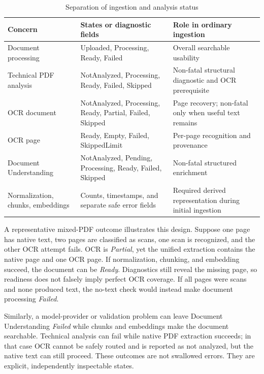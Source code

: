 \begin{table}[!htbp]
	\centering
	\small
	\caption{Separation of ingestion and analysis status}
	\label{tab:processing-statuses}
	\begin{tabular}{p{3.0cm}p{5.2cm}p{4.8cm}}
		\toprule
		Concern & States or diagnostic fields & Role in ordinary ingestion \\
		\midrule
		Document processing & Uploaded, Processing, Ready, Failed & Overall searchable usability \\
		Technical PDF analysis & NotAnalyzed, Processing, Ready, Failed, Skipped & Non-fatal structural diagnostic and OCR prerequisite \\
		OCR document & NotAnalyzed, Processing, Ready, Partial, Failed, Skipped & Page recovery; non-fatal only when useful text remains \\
		OCR page & Ready, Empty, Failed, SkippedLimit & Per-page recognition and provenance \\
		Document Understanding & NotAnalyzed, Pending, Processing, Ready, Failed, Skipped & Non-fatal structured enrichment \\
		Normalization, chunks, embeddings & Counts, timestamps, and separate safe error fields & Required derived representation during initial ingestion \\
		\bottomrule
	\end{tabular}
\end{table}

A representative mixed-PDF outcome illustrates this design. Suppose one page
has native text, two pages are classified as scans, one scan is recognized, and
the other OCR attempt fails. OCR is \emph{Partial}, yet the unified extraction
contains the native page and one OCR page. If normalization, chunking, and
embedding succeed, the document can be \emph{Ready}. Diagnostics still reveal
the missing page, so readiness does not falsely imply perfect OCR coverage. If
all pages were scans and none produced text, the no-text check would instead
make document processing \emph{Failed}.

Similarly, a model-provider or validation problem can leave Document
Understanding \emph{Failed} while chunks and embeddings make the document
searchable. Technical analysis can fail while native PDF extraction succeeds;
in that case OCR cannot be safely routed and is reported as not analyzed, but
the native text can still proceed. These outcomes are not swallowed errors.
They are explicit, independently inspectable states.

